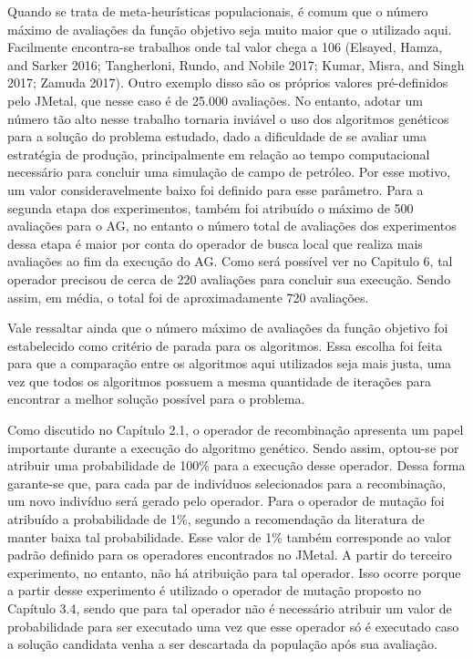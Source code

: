 \documentclass[12pt,a4paper]{report}
\begin{document}
Quando se trata de meta-heurísticas populacionais, é comum que o número máximo de avaliações da função objetivo seja muito maior que o utilizado aqui. Facilmente encontra-se trabalhos onde tal valor chega a 106 (Elsayed, Hamza, and Sarker 2016; Tangherloni, Rundo, and Nobile 2017; Kumar, Misra, and Singh 2017; Zamuda 2017). Outro exemplo disso são os próprios valores pré-definidos pelo JMetal, que nesse caso é de 25.000 avaliações. No entanto, adotar um número tão alto nesse trabalho tornaria inviável o uso dos algoritmos genéticos para a solução do problema estudado, dado a dificuldade de se avaliar uma estratégia de produção, principalmente em relação ao tempo computacional necessário para concluir uma simulação de campo de petróleo. Por esse motivo, um valor consideravelmente baixo foi definido para esse parâmetro. Para a segunda etapa dos experimentos, também foi atribuído o máximo de 500 avaliações para o AG, no entanto o número total de avaliações dos experimentos dessa etapa é maior por conta do operador de busca local que realiza mais avaliações ao fim da execução do AG. Como será possível ver no Capitulo 6, tal operador precisou de cerca de 220 avaliações para concluir sua execução. Sendo assim, em média, o total foi de aproximadamente 720 avaliações.

Vale ressaltar ainda que o número máximo de avaliações da função objetivo foi estabelecido como critério de parada para os algoritmos. Essa escolha foi feita para que a comparação entre os algoritmos aqui utilizados seja mais justa, uma vez que todos os algoritmos possuem a mesma quantidade de iterações para encontrar a melhor solução possível para o problema. 

Como discutido no Capítulo 2.1, o operador de recombinação apresenta um papel importante durante a execução do algoritmo genético. Sendo assim, optou-se por atribuir uma probabilidade de 100\% para a execução desse operador. Dessa forma garante-se que, para cada par de indivíduos selecionados para a recombinação, um novo indivíduo será gerado pelo operador. Para o operador de mutação foi atribuído a probabilidade de 1\%, segundo a recomendação da literatura de manter baixa tal probabilidade. Esse valor de 1\% também corresponde ao valor padrão definido para os operadores encontrados no JMetal. A partir do terceiro experimento, no entanto, não há atribuição para tal operador. Isso ocorre porque a partir desse experimento é utilizado o operador de mutação proposto no Capítulo 3.4, sendo que para tal operador não é necessário atribuir um valor de probabilidade para ser executado uma vez que esse operador só é executado caso a solução candidata venha a ser descartada da população após sua avaliação.
\end{document}
